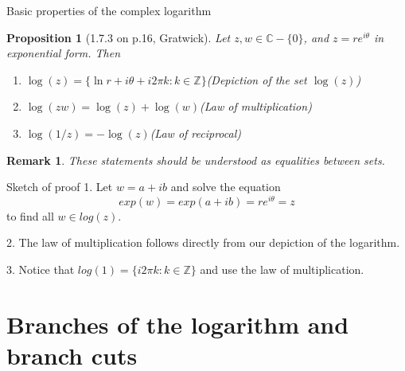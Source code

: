 \documentclass{beamer}
\newtheorem{remark}{Remark}
\newtheorem{proposition}{Proposition}
\begin{document}
\begin{frame}{Basic properties of the complex logarithm}

\begin{proposition}[1.7.3 on p.16, Gratwick]
	Let $z,w\in\mathbb{C}-\{0\}$, and $z=re^{i\theta}$ in exponential form. Then
	\begin{enumerate}
		\item $\log(z)=\{\ln r+i\theta+i2\pi k:k\in\mathbb{Z}\}$\quad (Depiction of the set $\log(z)$)\pause
		\item $\log(zw)=\log(z)+\log(w)$\quad(Law of multiplication)\pause
		\item $\log(1/z)=-\log(z)$\quad (Law of reciprocal)\pause
	\end{enumerate}
\end{proposition}
	
\begin{remark}
	These statements should be understood as equalities between \emph{sets}.
\end{remark}


\end{frame}
\begin{frame}{Sketch of proof}
	1.
	Let $w=a+ib$ and solve the equation
		$$exp(w)=exp(a+ib)=re^{i\theta}=z$$
	to find all $w\in log(z)$.\pause
\vspace{3ex}

	2.
	The law of multiplication follows directly from our depiction of the logarithm.\pause
\vspace{3ex}

	3.
	Notice that $log(1)=\{i2\pi k:k\in\mathbb{Z}\}$ and use the law of multiplication.
	
\end{frame}


\section{Branches of the logarithm and branch cuts}


\end{document}
